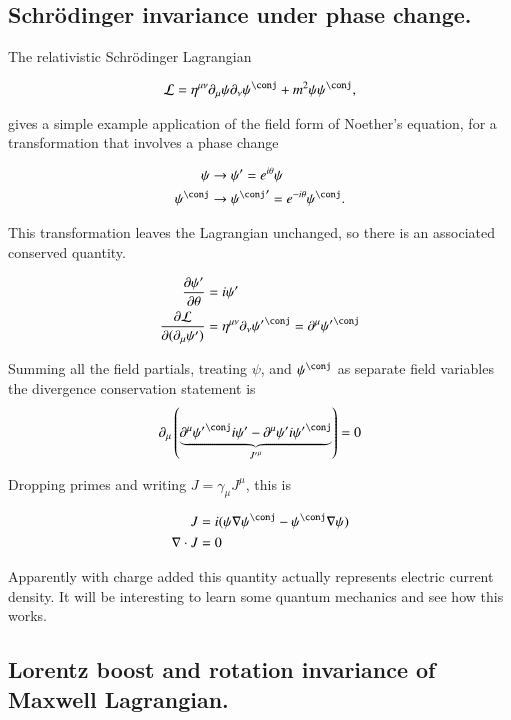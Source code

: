 \subsection{Schr\"{o}dinger invariance under phase change. }

The relativistic Schr\"{o}dinger Lagrangian

\begin{align*}
\LL = \eta^{\mu\nu}\partial_\mu \psi \partial_\nu \psi^\conj + m^2 \psi \psi^\conj,
\end{align*}

gives a simple example application of the field form of Noether's equation, for a 
transformation that involves a phase change

\begin{align*}
\psi &\rightarrow \psi' = e^{i\theta}\psi \\
\psi^\conj &\rightarrow {\psi^\conj}' = e^{-i\theta}\psi^\conj.
\end{align*}

This transformation leaves the Lagrangian unchanged, so there is an associated conserved
quantity.

\begin{align*}
\PD{\theta}{\psi'} &= i \psi' \\
\PD{(\partial_\mu \psi')}{\LL} &= \eta^{\mu\nu}\partial_\nu {\psi'}^\conj = \partial^\mu {\psi'}^\conj 
\end{align*}

Summing all the field partials, treating $\psi$, and $\psi^\conj$ as separate
field variables the divergence conservation statement is
\begin{align*}
\partial_\mu \left(
\underbrace{
\partial^\mu {\psi'}^\conj i\psi'
-\partial^\mu {\psi'} i{\psi'}^\conj
}_{{J'}^\mu}
\right) = 0
\end{align*}

Dropping primes and writing $J = \gamma_\mu J^\mu$, this is

\begin{align*}
J &= i (\psi \grad {\psi}^\conj - \psi^\conj \grad {\psi} ) \\
\grad \cdot J &= 0
\end{align*}

Apparently with charge added this quantity actually represents electric current density.  It will be interesting to
learn some quantum mechanics and see how this works.

\subsection{Lorentz boost and rotation invariance of Maxwell Lagrangian. }

